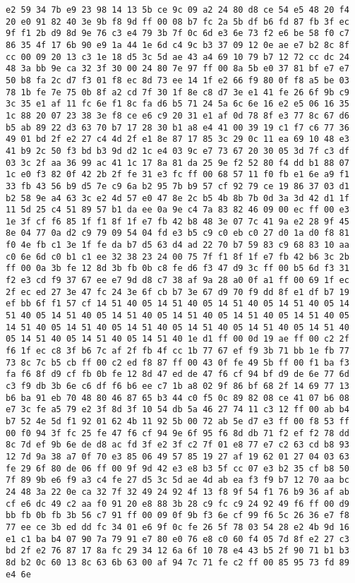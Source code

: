 \documentclass{article}
\begin{document}
\begin{verbatim}
e2 59 34 7b e9 23 98 14 13 5b ce 9c 09 a2 24 80 d8 ce 54 e5 48 20 f4 20 e0 91 82 40 3e 9b f8 9d ff 00 08 b7 fc 2a 5b df b6 fd 87 fb 3f ec 9f f1 2b d9 8d 9e 76 c3 e4 79 3b 7f 0c 6d e3 6e 73 f2 e6 be 58 f0 c7 86 35 4f 17 6b 90 e9 1a 44 1e 6d c4 9c b3 37 09 12 0e ae e7 b2 8c 8f cc 00 09 20 13 c3 1e 18 d5 3c 5d ae 43 a4 69 10 79 b7 12 72 cc dc 24 48 3a bb 9e ca 32 3f 30 00 24 80 7e 97 ff 00 8a 5b e0 37 81 bf e7 e7 50 b8 fa 2c d7 f3 01 f8 ec 8d 73 ee 14 1f e2 66 f9 80 0f f8 a5 be 03 78 1b fe 7e 75 0b 8f a2 cd 7f 30 1f 8e c8 d7 3e e1 41 fe 26 6f 9b c9 3c 35 e1 af 11 fc 6e f1 8c fa d6 b5 71 24 5a 6c 6e 16 e2 e5 06 16 35 1c 88 20 07 23 38 3e f8 ce e6 c9 20 31 e1 af 0d 78 8f e3 77 8c 67 d6 b5 ab 89 22 d3 63 70 b7 17 28 30 b1 a8 e4 41 00 39 19 c1 f7 c6 77 36 49 01 bd 2f e2 27 c4 4d 2f e1 8e 87 17 85 3c 29 0c 11 ea 69 10 48 e3 41 b9 2c 50 f3 bd b3 9d d2 1c e4 03 9c e7 73 67 20 30 05 3d 7f c3 df 03 3c 2f aa 36 99 ac 41 1c 17 8a 81 da 25 9e f2 52 80 f4 dd b1 88 07 1c e0 f3 82 0f 42 2b 2f fe 31 e3 fc ff 00 68 57 11 f0 fb e1 6e a9 f1 33 fb 43 56 b9 d5 7e c9 6a b2 95 7b b9 57 cf 92 79 ce 19 86 37 03 d1 b2 58 9e a4 63 3c e2 4d 57 e0 47 8e 2c b5 4b 8b 7b 0d 3a 3d 42 d1 1f 11 5d 25 c4 51 89 57 b1 da ee 0a 9e c4 7a 83 82 46 09 00 ec ff 00 e3 1e 3f cf f6 85 1f f1 8f 1f e7 fb 42 b8 48 3e 07 7c 41 9a e2 28 9f 45 8e 04 77 0a d2 c9 79 09 54 04 fd e3 b5 c9 c0 eb c0 27 d0 1a d0 f8 81 f0 4e fb c1 3e 1f fe da b7 d5 63 d4 ad 22 70 b7 59 83 c9 68 83 10 aa c0 6e 6d c0 b1 c1 ee 32 38 23 24 00 75 7f f1 8f 1f e7 fb 42 b6 3c 2b ff 00 0a 3b fe 12 8d 3b fb 0b c8 fe d6 f3 47 d9 3c ff 00 b5 6d f3 31 f2 e3 cd f9 37 67 ee e7 9d d8 c7 38 af 9a 28 a0 0f a1 ff 00 69 1f ec 2f ec ed 27 3e 47 fc 24 3e 6f cb b7 3e 67 d9 70 f9 dd 8f e1 df b7 19 ef bb 6f f1 57 cf 14 51 40 05 14 51 40 05 14 51 40 05 14 51 40 05 14 51 40 05 14 51 40 05 14 51 40 05 14 51 40 05 14 51 40 05 14 51 40 05 14 51 40 05 14 51 40 05 14 51 40 05 14 51 40 05 14 51 40 05 14 51 40 05 14 51 40 05 14 51 40 05 14 51 40 1e d1 ff 00 0d 19 ae ff 00 c2 2f f6 1f ec c8 3f b6 7c af 2f fb 4f cc 1b 77 67 ef f9 3b 71 bb 1e fb 77 73 8c 7c b5 cb ff 00 c2 ed f8 87 ff 00 43 0f fe 49 5b ff 00 f1 ba f3 fa f6 8f d9 cf fb 0b fe 12 8d 47 ed de 47 f6 cf 94 bf d9 de 6e 77 6d c3 f9 db 3b 6e c6 df f6 b6 ee c7 1b a8 02 9f 86 bf 68 2f 14 69 77 13 b6 ba 91 eb 70 48 80 46 87 65 b3 44 c0 f5 0c 89 82 08 ce 41 07 b6 08 e7 3c fe a5 79 e2 3f 8d 3f 10 54 db 5a 46 27 74 11 c3 12 ff 00 ab b4 b7 52 4e 5d f1 92 01 62 4b 11 92 5b 00 72 ab 5e d7 e3 ff 00 f8 53 ff 00 f0 94 3f fc 25 fe 47 f6 cf 94 9e 6f 95 f6 8d db 71 f2 ef f2 78 dd 8c 7d ef 9b 6e de d8 ac fd 3f e2 3f c2 7f 01 e8 77 e7 c2 63 cd b8 93 12 7d 9a 38 a7 0f 70 e3 85 06 49 57 85 19 27 af 19 62 01 27 04 03 63 fe 29 6f 80 de 06 ff 00 9f 9d 42 e3 e8 b3 5f cc 07 e3 b2 35 cf b8 50 7f 89 9b e6 f9 a3 c4 fe 27 d5 3c 5d ae 4d ab ea f3 f9 b7 12 70 aa bc 24 48 3a 22 0e ca 32 7f 32 49 24 92 4f 13 f8 9f 54 f1 76 b9 36 af ab cf e6 dc 49 c2 aa f0 91 20 e8 88 3b 28 c9 fc c9 24 92 49 f6 ff 00 d9 bb fb 0b fb 3b 56 c7 91 ff 00 09 0f 9b f3 6e cf 99 f6 5c 26 36 e7 f8 77 ee ce 3b ed dd fc 34 01 e6 9f 0c fe 26 5f 78 03 54 28 e2 4b 9d 16 e1 c1 ba b4 07 90 7a 79 91 e7 80 e0 76 e8 c0 60 f4 05 7d 8f e2 27 c3 bd 2f e2 76 87 17 8a fc 29 34 12 6a 6f 10 78 e4 43 b5 2f 90 71 b1 b3 8d b2 0c 60 13 8c 63 6b 63 00 af 94 7c 71 fe c2 ff 00 85 95 73 fd 89 e4 6e 
\end{verbatim}
\end{document}
